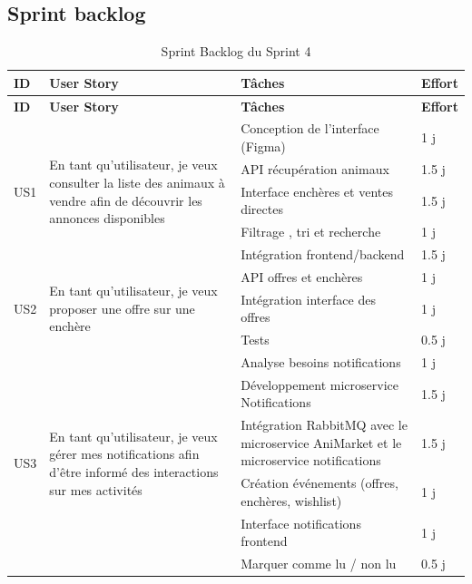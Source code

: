\subsection{Sprint backlog}  
\begin{longtable}{|p{1cm}|p{5cm}|p{8cm}|p{1cm}|}
\caption{Sprint Backlog du Sprint 4}
\label{tab:sprint4-backlog} \\ 
\hline
\rowcolor{coloranimarket}
\textbf{ID} & \textbf{User Story} & \textbf{Tâches} & \textbf{Effort} \\
\hline
\endfirsthead

\hline
\rowcolor{coloranimarket}
\textbf{ID} & \textbf{User Story} & \textbf{Tâches} & \textbf{Effort} \\
\hline
\endhead

\multirow{5}{2cm}{US1}
& \multirow{5}{5cm}{En tant qu’utilisateur, je veux consulter la liste des animaux à vendre afin de découvrir les annonces disponibles}
& Conception de l’interface (Figma) & 1 j \\
\cline{3-4}
& & API récupération animaux & 1.5 j \\
\cline{3-4}
& & Interface enchères et ventes directes  & 1.5 j \\
\cline{3-4}
& & Filtrage , tri et recherche & 1 j \\
\cline{3-4}
& & Intégration frontend/backend & 1.5 j \\
\hline

\multirow{3}{2cm}{US2}
& \multirow{3}{5cm}{En tant qu’utilisateur, je veux proposer une offre sur une enchère}
& API offres et enchères & 1 j \\
\cline{3-4}
& & Intégration interface des offres & 1 j \\
\cline{3-4}
& & Tests & 0.5 j \\
\hline

\multirow{6}{2cm}{US3}
& \multirow{6}{5cm}{En tant qu’utilisateur, je veux gérer mes notifications afin d’être informé des interactions sur mes activités}
& Analyse besoins notifications & 1 j \\
\cline{3-4}
& & Développement microservice Notifications & 1.5 j \\
\cline{3-4}
& & Intégration RabbitMQ avec le microservice AniMarket et le microservice notifications & 1.5 j \\
\cline{3-4}
& & Création événements (offres, enchères, wishlist) & 1 j \\
\cline{3-4}
& & Interface notifications frontend & 1 j \\
\cline{3-4}
& & Marquer comme lu / non lu & 0.5 j \\
\hline


\end{longtable}
